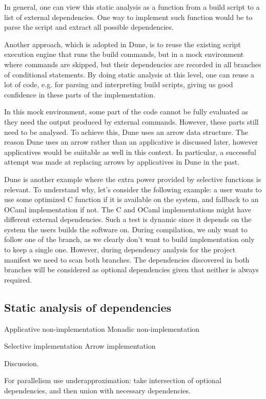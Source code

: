 In general, one can view this static analysis as a function from a build script
to a list of external dependencies. One way to implement such function would be
to parse the script and extract all possible dependencies.

Another approach, which is adopted in Dune, is to reuse the existing script
execution engine that runs the build commands, but in a mock environment where
commands are skipped, but their dependencies are recorded in all branches of
conditional statements. By doing static analysis at this level, one can reuse
a lot of code, e.g. for parsing and interpreting build scripts, giving us good
confidence in these parts of the implementation.

In this mock environment, some part of the code cannot be fully
evaluated as they need the output produced by external
commands. However, these parts still need to be analysed. To achieve
this, Dune uses an arrow data structure. The reason Dune uses an arrow
rather than an applicative is discussed later, however applicatives
would be suiitable as well in this context. In particular, a
successful attempt was made at replacing arrows by applicatives in
Dune in the past.

Dune is another example where the extra power provided by selective
functions is relevant. To understand why, let's consider the following
example: a user wants to use some optimized C function if it is
available on the system, and fallback to an OCaml implementation if
not. The C and OCaml implementations might have different external
dependencies. Such a test is dynamic since it depends on the system
the users builds the software on. During compilation, we only want to
follow one of the branch, as we clearly don't want to build
implementation only to keep a single one. However, during dependency
analysis for the project manifest we need to scan both branches. The
dependencies discovered in both branches will be considered as
optional dependencies given that neither is always required.

\subsection{Static analysis of dependencies}



Applicative non-implementation
Monadic non-implementation

Selective implementation
Arrow implementation

Discussion.

For parallelism use underapproximation: take intersection of optional
dependencies, and then union with necessary dependencies.
